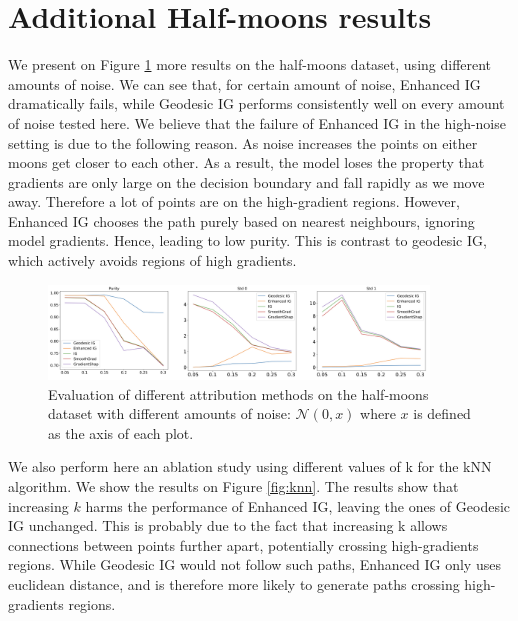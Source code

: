 \newpage

\section{Additional Half-moons results}
\label{app:half-moons}

We present on Figure \ref{fig:noises} more results on the half-moons dataset, using different amounts of noise. We can see that, for certain amount of noise, Enhanced IG dramatically fails, while Geodesic IG performs consistently well on every amount of noise tested here. We believe that the failure of Enhanced IG in the high-noise setting is due to the following reason. As noise increases the points on either moons get closer to each other. As a result, the model loses the property that gradients are only large on the decision boundary and fall rapidly as we move away. Therefore a lot of points are on the high-gradient regions. However, Enhanced IG chooses the path purely based on nearest neighbours, ignoring model gradients. Hence, leading to low purity. This is contrast to geodesic IG, which actively avoids regions of high gradients.

\begin{figure}[ht]
\vskip 0.2in
\begin{center}
\centerline{\includegraphics[width=0.9\textwidth]{figures/noises.png}}
\caption{Evaluation of different attribution methods on the half-moons dataset with different amounts of noise: $\mathcal{N}(0, x)$ where $x$ is defined as the axis of each plot.}
\label{fig:noises}
\end{center}
\vskip -0.2in
\end{figure}

We also perform here an ablation study using different values of k for the kNN algorithm. We show the results on Figure \ref{fig:knn}. The results show that increasing $k$ harms the performance of Enhanced IG, leaving the ones of Geodesic IG unchanged. This is probably due to the fact that increasing k allows connections between points further apart, potentially crossing high-gradients regions. While Geodesic IG would not follow such paths, Enhanced IG only uses euclidean distance, and is therefore more likely to generate paths crossing high-gradients regions.

